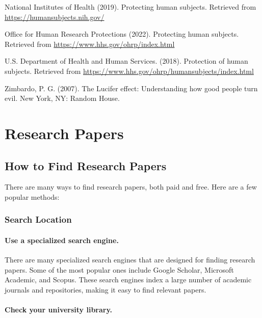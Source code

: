 \documentclass[
  b5paper]{book}
\begin{document}
National Institutes of Health (2019). Protecting human subjects. Retrieved from \url{https://humansubjects.nih.gov/}

Office for Human Research Protections (2022). Protecting human subjects. Retrieved from \url{https://www.hhs.gov/ohrp/index.html}

U.S. Department of Health and Human Services. (2018). Protection of human subjects. Retrieved from \url{https://www.hhs.gov/ohrp/humansubjects/index.html}

Zimbardo, P. G. (2007). The Lucifer effect: Understanding how good people turn evil. New York, NY: Random House.

\hypertarget{research-papers-1}{%
\chapter{Research Papers}\label{research-papers-1}}

\hypertarget{how-to-find-research-papers}{%
\section{How to Find Research Papers}\label{how-to-find-research-papers}}

There are many ways to find research papers, both paid and free. Here are a few popular methods:

\hypertarget{search-location}{%
\subsection*{Search Location}\label{search-location}}

\hypertarget{use-a-specialized-search-engine.}{%
\subsubsection*{Use a specialized search engine.}\label{use-a-specialized-search-engine.}}

There are many specialized search engines that are designed for finding research papers. Some of the most popular ones include Google Scholar, Microsoft Academic, and Scopus. These search engines index a large number of academic journals and repositories, making it easy to find relevant papers.

\hypertarget{check-your-university-library.}{%
\subsubsection*{Check your university library.}\label{check-your-university-library.}}
\end{document}
